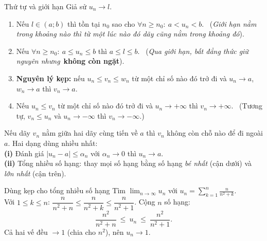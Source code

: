 \documentclass[11pt, a4paper, twoside]{article}
\newcommand{\limn}{\lim_{n\to\infty}}
\begin{document}
\begin{tc}{Thứ tự và giới hạn}
Giả sử $u_n\to l$.
\begin{enumerate}[label=\textbf{\arabic*.}, leftmargin=*, itemsep=3pt, topsep=2pt]
  \item Nếu $l\in(a;b)$ thì tồn tại $n_0$ sao cho $\forall n\ge n_0:\ a<u_n<b$. \ (\emph{Giới hạn nằm trong khoảng nào thì từ một lúc nào đó dãy cũng nằm trong khoảng đó}).
  \item Nếu $\forall n\ge n_0:\ a\le u_n\le b$ thì $a\le l\le b$. \ (\emph{Qua giới hạn, bất đẳng thức giữ nguyên nhưng}\ \textbf{không còn ngặt}).
  \item \textbf{Nguyên lý kẹp:} nếu $u_n\le v_n\le w_n$ từ một chỉ số nào đó trở đi và $u_n\to a$, $w_n\to a$ thì $v_n\to a$.
  \item Nếu $u_n\le v_n$ từ một chỉ số nào đó trở đi và $u_n\to+\infty$ thì $v_n\to+\infty$. \ (Tương tự, $v_n\le u_n$ và $u_n\to-\infty$ thì $v_n\to-\infty$.)
\end{enumerate}
\end{tc}
\vspace{0.3cm}
\vspace{0.3cm}
\begin{hy}[HIỂU Ý: kẹp = ``hai người bạn kẹp một người''. Dùng thế nào?]
Nếu dãy $v_n$ nằm giữa hai dãy cùng tiến về $a$ thì $v_n$ không còn chỗ nào để đi ngoài $a$. Hai dạng dùng nhiều nhất:\\
\textbf{(i)} Đánh giá $|u_n-a|\le\alpha_n$ với $\alpha_n\to0$ thì $u_n\to a$.\\
\textbf{(ii)} Tổng nhiều số hạng: thay mọi số hạng bằng số hạng \emph{bé nhất} (cận dưới) và \emph{lớn nhất} (cận trên).
\end{hy}

\begin{vd}{Dùng kẹp cho tổng nhiều số hạng}
Tìm $\displaystyle\limn u_n$ với $u_n=\sum_{k=1}^n\frac{n}{n^2+k}$.\\
Với $1\le k\le n$: $\dfrac n{n^2+n}\le\dfrac n{n^2+k}\le\dfrac n{n^2+1}$. Cộng $n$ số hạng:
\[ \frac{n^2}{n^2+n}\ \le\ u_n\ \le\ \frac{n^2}{n^2+1}. \]
Cả hai vế đều $\to1$ (chia cho $n^2$), nên $u_n\to1$.
\end{vd}
\end{document}
